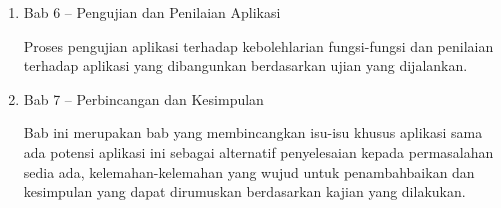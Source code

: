 \begin{enumerate}
\item Bab 6 – Pengujian dan Penilaian Aplikasi

Proses pengujian aplikasi terhadap kebolehlarian fungsi-fungsi dan penilaian terhadap aplikasi yang dibangunkan berdasarkan ujian yang dijalankan.

\item Bab 7 – Perbincangan dan Kesimpulan

Bab ini merupakan bab yang membincangkan isu-isu khusus aplikasi sama ada potensi aplikasi ini sebagai alternatif penyelesaian kepada permasalahan sedia ada, kelemahan-kelemahan yang wujud untuk penambahbaikan dan kesimpulan yang dapat dirumuskan berdasarkan kajian yang dilakukan.
\end{enumerate}
\egroup

